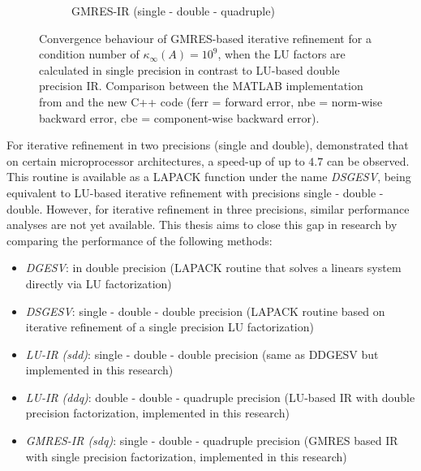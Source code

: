\begin{figure}
\begin{subfigure}{.5\textwidth}
  \caption{GMRES-IR (single - double - quadruple)}
  \label{fig:gmressdq}
\end{subfigure}
\caption[GMRES based IR in 3 Precisions]{Convergence behaviour of GMRES-based iterative refinement for a condition number of $\kappa_\infty (A)=10^9$, when the LU factors are calculated in single precision in contrast to LU-based double precision IR. Comparison between the MATLAB implementation from \cite{carson_new_2017} and the new C++ code (ferr = forward error, nbe = norm-wise backward error, cbe = component-wise backward error).}
\label{fig:gmres_ir3}
\end{figure}

For iterative refinement in two precisions (single and double), \cite{langou_exploiting_2006} demonstrated that on certain microprocessor architectures, a speed-up of up to $4.7$ can be observed. This routine is available as a LAPACK function under the name \textit{DSGESV}, being equivalent to LU-based iterative refinement with precisions single - double - double. However, for iterative refinement in three precisions, similar performance analyses are not yet available. This thesis aims to close this gap in research by comparing the performance of the following methods:
\begin{itemize}
    \item \textit{DGESV}: in double precision (LAPACK routine that solves a linears system directly via LU factorization)
    \item \textit{DSGESV}: single - double - double precision (LAPACK routine based on iterative refinement of a single precision LU factorization)
    \item \textit{LU-IR (sdd)}: single - double - double precision (same as DDGESV but implemented in this research)
    \item \textit{LU-IR (ddq)}: double - double - quadruple precision (LU-based IR with double precision factorization, implemented in this research)
    \item \textit{GMRES-IR (sdq)}: single - double - quadruple precision (GMRES based IR with single precision factorization, implemented in this research)
\end{itemize}

